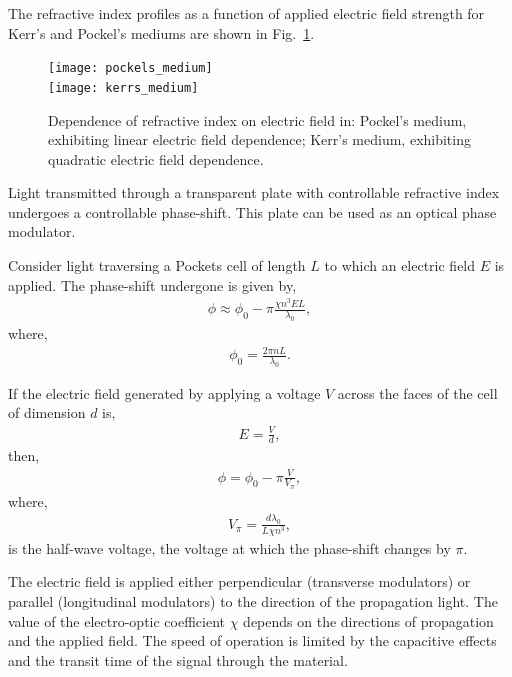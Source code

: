 The refractive index profiles as a function of applied electric field strength for Kerr's and Pockel's mediums are shown in Fig.~\ref{fig:EOM_ref_index}.

\begin{figure}[!htbp]
\texttt{[image: pockels\_medium]} \pubmode \\ \fi
\texttt{[image: kerrs\_medium]}
\caption{Dependence of refractive index on electric field in: Pockel's medium, exhibiting linear electric field dependence; Kerr's medium, exhibiting quadratic electric field dependence.}\label{fig:EOM_ref_index}
\end{figure}

Light transmitted through a transparent plate with controllable refractive index undergoes a controllable phase-shift. This plate can be used as an optical phase modulator.

Consider light traversing a Pockets cell of length $L$ to which an electric field $E$ is applied. The phase-shift undergone is given by,
\begin{align}
\phi \approx \phi_0 - \pi\frac{\chi n^3 E L}{\lambda_0},
\end{align}
where,
\begin{align}
\phi_0 = \frac{2\pi nL}{\lambda_0}.
\end{align}

If the electric field generated by applying a voltage $V$ across the faces of the cell of dimension $d$ is,
\begin{align}
	E=\frac{V}{d},
\end{align}
then,
\begin{align}
	\phi=\phi_0-\pi \frac{V}{V_\pi},
\end{align}
where,
\begin{align}
	V_\pi=\frac{d\lambda_0}{L\chi n^3},
\end{align}
is the half-wave voltage, the voltage at which the phase-shift changes by $\pi$.

The electric field is applied either perpendicular (transverse modulators) or parallel (longitudinal modulators) to the direction of the propagation light. The value of the electro-optic coefficient $\chi$ depends on the directions of propagation and the applied field. The speed of operation is limited by the capacitive effects and the transit time of the signal through the material. 

